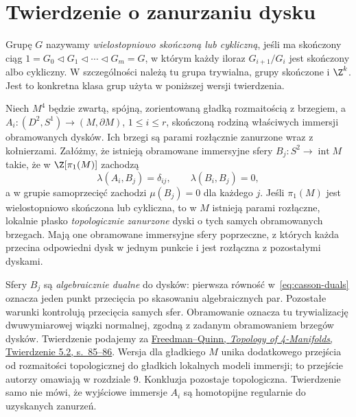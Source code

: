 \section{Twierdzenie o zanurzaniu dysku}
\label{sec:casson-disk-theorem}

Grupę $G$ nazywamy \emph{wielostopniowo skończoną
lub cykliczną}, jeśli ma skończony ciąg
$1=G_0\triangleleft G_1\triangleleft\cdots
\triangleleft G_m=G$, w którym każdy iloraz
$G_{i+1}/G_i$ jest skończony albo cykliczny.
W szczególności należą tu grupa trywialna,
grupy skończone i $\Z^k$. Jest to konkretna
klasa grup użyta w poniższej wersji twierdzenia.

\begin{twierdzenie}
\label{thm:casson-disk-embedding}
Niech $M^4$ będzie zwartą, spójną, zorientowaną gładką
rozmaitością z brzegiem, a
$A_i:(D^2,S^1)\to(M,\partial M)$,
$1\leq i\leq r$, skończoną rodziną właściwych
immersji obramowanych dysków. Ich brzegi
są parami rozłącznie zanurzone wraz z kołnierzami.
Załóżmy, że istnieją obramowane immersyjne sfery
$B_j:S^2\to\operatorname{int}M$ takie, że w
$\Z[\pi_1(M)]$ zachodzą
\begin{equation}\label{eq:casson-duals}
 \lambda(A_i,B_j)=\delta_{ij},\qquad
 \lambda(B_i,B_j)=0,
\end{equation}
a w grupie samoprzecięć zachodzi $\mu(B_j)=0$
dla każdego $j$. Jeśli $\pi_1(M)$ jest
wielostopniowo skończona lub cykliczna, to w $M$
istnieją parami rozłączne, lokalnie płasko
\emph{topologicznie zanurzone} dyski o tych samych
obramowanych brzegach. Mają one obramowane immersyjne sfery
poprzeczne, z których każda przecina odpowiedni
dysk w jednym punkcie i jest rozłączna z pozostałymi
dyskami.
\end{twierdzenie}

Sfery $B_j$ są \emph{algebraicznie dualne} do
dysków: pierwsza równość w~\eqref{eq:casson-duals}
oznacza jeden punkt przecięcia po skasowaniu
algebraicznych par. Pozostałe warunki kontrolują
przecięcia samych sfer. Obramowanie oznacza tu
trywializację dwuwymiarowej wiązki normalnej,
zgodną z zadanym obramowaniem brzegów dysków.
Twierdzenie podajemy za
\href{https://archive.mpim-bonn.mpg.de/4789/2/FreedmanQuinn-TopologyOf4Manifolds-Reformatted2013.pdf}
{Freedman--Quinn, \emph{Topology of 4-Manifolds},
Twierdzenie 5.2, s.\ 85--86}. Wersja dla gładkiego
$M$ unika dodatkowego przejścia od rozmaitości
topologicznej do gładkich lokalnych modeli
immersji; to przejście autorzy omawiają
w rozdziale 9. Konkluzja pozostaje topologiczna.
Twierdzenie samo nie mówi, że wyjściowe immersje $A_i$
są homotopijne regularnie do uzyskanych zanurzeń.

